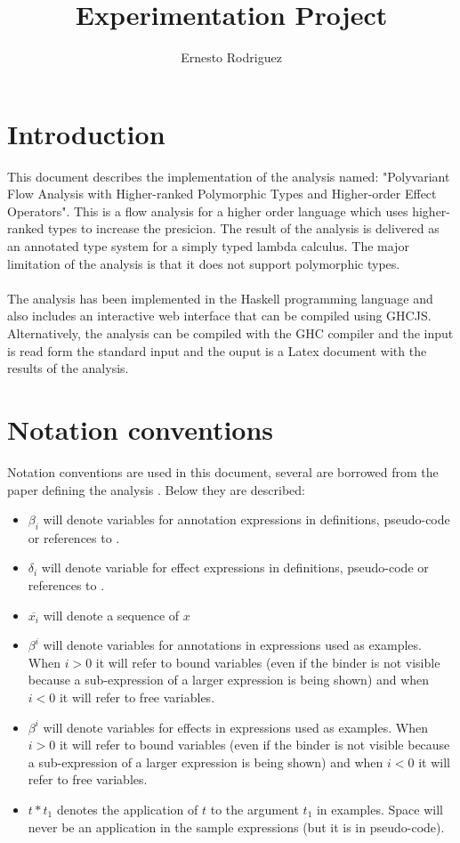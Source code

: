 \documentclass[8pt]{extarticle}
\title{Experimentation Project}
\author{Ernesto Rodriguez}
\begin{document}
\maketitle
\section{Introduction}
This document describes the implementation of the analysis named: "Polyvariant Flow Analysis with Higher-ranked Polymorphic Types and Higher-order Effect Operators". This is a flow analysis for a higher order language which uses higher-ranked types to increase the presicion. The result of the analysis is delivered as an annotated type system for a simply typed lambda calculus. The major limitation of the analysis is that it does not support polymorphic types.
\\\\
The analysis has been implemented in the Haskell programming language and also includes an interactive web interface that can be compiled using GHCJS\cite{GHCJS}. Alternatively, the analysis can be compiled with the GHC compiler and the input is read form the standard input and the ouput is a Latex document with the results of the analysis.
\section{Notation conventions}
Notation conventions are used in this document, several are borrowed from the paper defining the analysis \cite{analysis}. Below they are described:
\begin{itemize}
\item $\beta_i$ will denote variables for annotation expressions in definitions, pseudo-code or references to \cite{analysis}.
\item $\delta_i$ will denote variable for effect expressions in definitions, pseudo-code or references to \cite{analysis}.
\item $\overline{x_i}$ will denote a sequence of $x$
\item $\beta^{i}$ will denote variables for annotations in expressions used as examples. When $i>0$ it will refer to bound variables (even if the binder is not visible because a sub-expression of a larger expression is being shown) and when $i<0$ it will refer to free variables.
\item $\beta^{i}$ will denote variables for effects in expressions used as examples. When $i>0$ it will refer to bound variables (even if the binder is not visible because a sub-expression of a larger expression is being shown) and when $i<0$ it will refer to free variables.
\item $t*t_1$ denotes the application of $t$ to the argument $t_1$ in examples. Space will never be an application in the sample expressions (but it is in pseudo-code).
\end{itemize}
\end{document}

